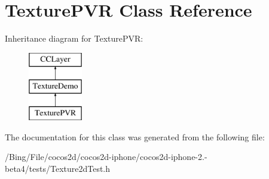 \hypertarget{interface_texture_p_v_r}{\section{Texture\-P\-V\-R Class Reference}
\label{interface_texture_p_v_r}
}
Inheritance diagram for Texture\-P\-V\-R\-:\begin{figure}[H]
\begin{center}
\leavevmode
\includegraphics[height=3.000000cm]{interface_texture_p_v_r}
\end{center}
\end{figure}


The documentation for this class was generated from the following file\-:\begin{DoxyCompactItemize}
\item 
/\-Bing/\-File/cocos2d/cocos2d-\/iphone/cocos2d-\/iphone-\/2.-\/beta4/tests/Texture2d\-Test.\-h\end{DoxyCompactItemize}
